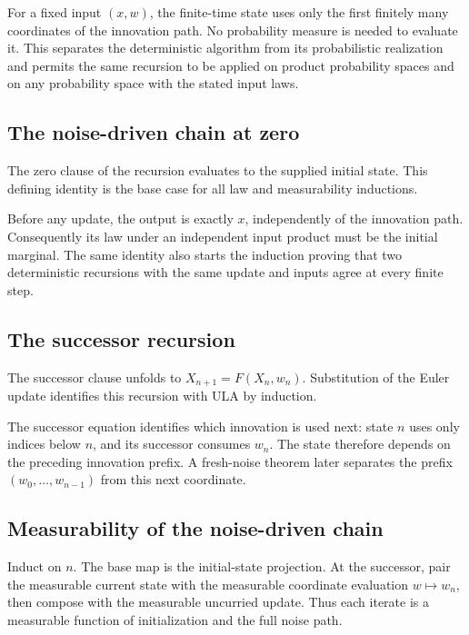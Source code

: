 \documentclass[11pt,a4paper]{article}
\begin{document}
For a fixed input \((x,w)\), the finite-time state uses only the first finitely many coordinates of the innovation path. No probability measure is needed to evaluate it. This separates the deterministic algorithm from its probabilistic realization and permits the same recursion to be applied on product probability spaces and on any probability space with the stated input laws.


\subsection{\texorpdfstring{The noise-driven chain at zero}{The noise-driven chain at zero}}


The zero clause of the recursion evaluates to the supplied initial state. This defining identity is the base case for all law and measurability inductions.



Before any update, the output is exactly \(x\), independently of the innovation path. Consequently its law under an independent input product must be the initial marginal. The same identity also starts the induction proving that two deterministic recursions with the same update and inputs agree at every finite step.


\subsection{\texorpdfstring{The successor recursion}{The successor recursion}}


The successor clause unfolds to \(X_{n+1}=F(X_n,w_n)\). Substitution of the Euler update identifies this recursion with ULA by induction.



The successor equation identifies which innovation is used next: state \(n\) uses only indices below \(n\), and its successor consumes \(w_n\). The state therefore depends on the preceding innovation prefix. A fresh-noise theorem later separates the prefix \((w_0,\ldots,w_{n-1})\) from this next coordinate.


\subsection{\texorpdfstring{Measurability of the noise-driven chain}{Measurability of the noise-driven chain}}


Induct on \(n\). The base map is the initial-state projection. At the successor, pair the measurable current state with the measurable coordinate evaluation \(w\mapsto w_n\), then compose with the measurable uncurried update. Thus each iterate is a measurable function of initialization and the full noise path.
\end{document}
